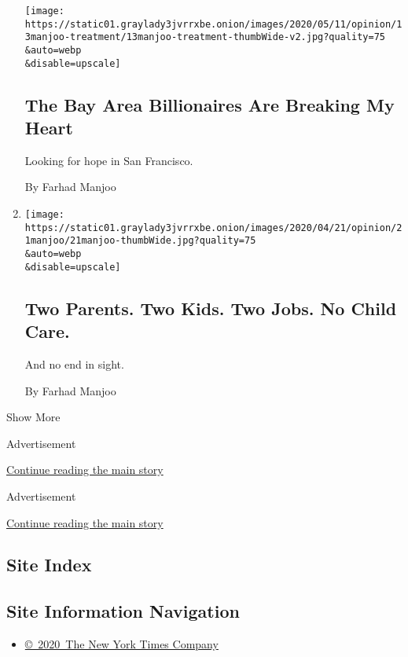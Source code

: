 \begin{enumerate}
  \texttt{[image: https://static01.graylady3jvrrxbe.onion/images/2020/05/11/opinion/13manjoo-treatment/13manjoo-treatment-thumbWide-v2.jpg?quality=75\\\&auto=webp\\\&disable=upscale]}

  \hypertarget{the-bay-area-billionaires-are-breaking-my-heart}{%
  \subsection{The Bay Area Billionaires Are Breaking My
  Heart}\label{the-bay-area-billionaires-are-breaking-my-heart}}

  Looking for hope in San Francisco.

  By Farhad Manjoo
\item
  \href{/2020/04/22/opinion/coronavirus-parenting-burnout.html}{}

  \texttt{[image: https://static01.graylady3jvrrxbe.onion/images/2020/04/21/opinion/21manjoo/21manjoo-thumbWide.jpg?quality=75\\\&auto=webp\\\&disable=upscale]}

  \hypertarget{two-parents-two-kids-two-jobs-no-child-care}{%
  \subsection{Two Parents. Two Kids. Two Jobs. No Child
  Care.}\label{two-parents-two-kids-two-jobs-no-child-care}}

  And no end in sight.

  By Farhad Manjoo
\end{enumerate}

Show More

Advertisement

\protect\hyperlink{after-mid1}{Continue reading the main story}

Advertisement

\protect\hyperlink{after-mktg}{Continue reading the main story}

\hypertarget{site-index}{%
\subsection{Site Index}\label{site-index}}

\hypertarget{site-information-navigation}{%
\subsection{Site Information
Navigation}\label{site-information-navigation}}

\begin{itemize}
\tightlist
\item
  \href{https://help.nytimes3xbfgragh.onion/hc/en-us/articles/115014792127-Copyright-notice}{©~2020~The
  New York Times Company}
\end{itemize}

